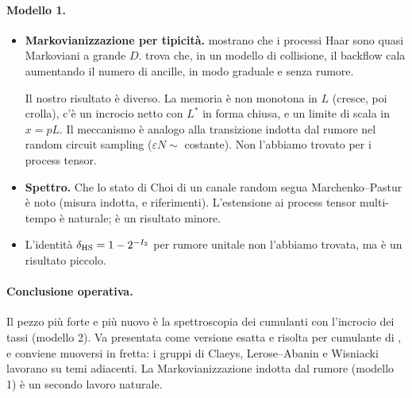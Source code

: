 \paragraph{Modello 1.}
\begin{itemize}[leftmargin=1.5em]
\item \textbf{Markovianizzazione per tipicità.} \cite{FMP19,FPM21} mostrano che i processi Haar sono quasi Markoviani a grande $D$. \cite{MRB23} trova che, in un modello di collisione, il backflow cala aumentando il numero di ancille, in modo graduale e senza rumore.

  Il nostro risultato è diverso. La memoria è non monotona in $L$ (cresce, poi crolla), c'è un incrocio netto con $L^*$ in forma chiusa, e un limite di scala in $x=pL$. Il meccanismo è analogo alla transizione indotta dal rumore nel random circuit sampling ($\varepsilon N\sim$ costante). Non l'abbiamo trovato per i process tensor.
\item \textbf{Spettro.} Che lo stato di Choi di un canale random segua Marchenko--Pastur è noto (misura indotta, \cite{IPR26} e riferimenti). L'estensione ai process tensor multi-tempo è naturale; è un risultato minore.
\item L'identità $\delta_{\rm HS}=1-2^{-I_2}$ per rumore unitale non l'abbiamo trovata, ma è un risultato piccolo.
\end{itemize}

\paragraph{Conclusione operativa.} Il pezzo più forte e più nuovo è la spettroscopia dei cumulanti con l'incrocio dei tassi (modello 2). Va presentata come versione esatta e risolta per cumulante di \cite{GGW26}, e conviene muoversi in fretta: i gruppi di Claeys, Lerose--Abanin e Wisniacki lavorano su temi adiacenti. La Markovianizzazione indotta dal rumore (modello 1) è un secondo lavoro naturale.
